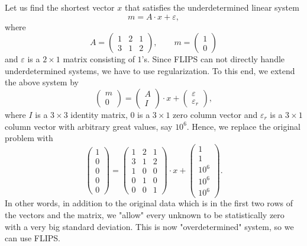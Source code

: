 \documentclass[a4paper,twoside]{refrep}
\begin{document}
Let us find the shortest vector $x$ that satisfies the underdetermined linear system
\[
m = A\cdot x + \varepsilon,
\]
where
\[
A=
\left(\begin{array}{ccc}1 & 2 & 1 \\3 & 1 & 2 \end{array}\right),\qquad
m=
\left(\begin{array}{c}1 \\ 0\end{array}\right)
\]
and $\varepsilon$ is a $2\times 1$ matrix consisting of $1$'s.
Since FLIPS can not directly handle underdetermined systems, we have to use regularization. To this end, we extend the above system by
\[
\left(\begin{array}{c}m \\0\end{array}\right) =
\left(\begin{array}{c}A \\I\end{array}\right)\cdot x +
\left(\begin{array}{c}\varepsilon \\\varepsilon_r\end{array}\right),
\]
where $I$ is a $3\times 3$ identity matrix, $0$ is a $3\times 1$ zero column vector and $\varepsilon_r$ is a $3\times 1$ column vector with arbitrary great values, say $10^6$. Hence, we replace the original problem with
\[
\left(\begin{array}{c}1 \\0 \\0 \\0 \\ 0\end{array}\right)
=
\left(\begin{array}{ccc}1 & 2 & 1 \\3 & 1 & 2 \\1 & 0 & 0 \\ 0 & 1 & 0 \\0 & 0 & 1\end{array}\right)\cdot x +
\left(\begin{array}{c}1 \\1 \\10^6 \\10^6 \\10^6\end{array}\right).
\]
In other words, in addition to the original data which is in the first two rows of the vectors and the matrix, we "allow" every unknown to be statistically zero with a very big standard deviation.
This is now "overdetermined" system, so we can use FLIPS.
\end{document}
